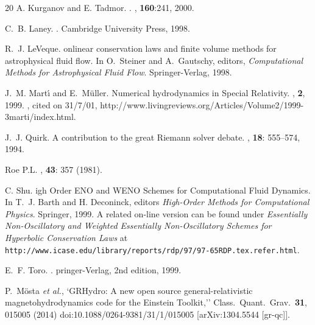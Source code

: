 \documentclass{article}
\begin{document}
\begin{thebibliography}{20}
A. Kurganov and E. Tadmor.
.
, {\bf 160}:241, 2000.

C.~B. Laney.
.
\newblock Cambridge University Press, 1998.

R.~J. LeVeque.
onlinear conservation laws and finite volume methods for
  astrophysical fluid flow.
\newblock In O.~Steiner and A.~Gautschy, editors, {\em {C}omputational
  {M}ethods for {A}strophysical {F}luid {F}low}. Springer-Verlag, 1998.

J.~M. Mart{\'{\i}} and E.~M{\"u}ller.
\newblock Numerical hydrodynamics in {S}pecial {R}elativity.
, {\bf 2}, 1999.
, cited on 31/7/01,
  http://www.livingreviews.org/Articles/Volume2/1999-3marti/index.html.

J.~J. Quirk.
\newblock A contribution to the great {R}iemann solver debate.
, {\bf 18}: 555--574,
  1994.

Roe P.L.
, {\bf 43}: 357 (1981).

C. Shu.
igh {O}rder {ENO} and {WENO} {S}chemes for
{C}omputational {F}luid {D}ynamics.
\newblock In T.~J. Barth and H. Deconinck, editors {\em High-Order
  Methods for Computational Physics}. Springer, 1999.
\newblock A related on-line version can be found under {\em Essentially
  {N}on-{O}scillatory and {W}eighted {E}ssentially {N}on-{O}scillatory
  {S}chemes for {H}yperbolic {C}onservation {L}aws} at {\tt
  http://www.icase.edu/library/reports/rdp/97/97-65RDP.tex.refer.html}. 

E.~F. Toro.
.
pringer-{V}erlag, 2nd edition, 1999.

  P.~Mösta {\it et al.},
  `GRHydro: A new open source general-relativistic magnetohydrodynamics code for the Einstein Toolkit,''
  Class.\ Quant.\ Grav.\  {\bf 31}, 015005 (2014)
  doi:10.1088/0264-9381/31/1/015005
  [arXiv:1304.5544 [gr-qc]].

\end{thebibliography}

\end{document}
